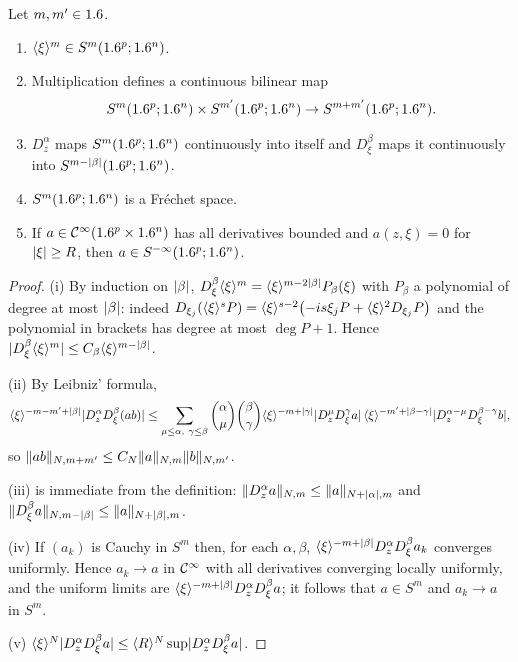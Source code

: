 \begin{lemma}\label{euclidean:lem:symbol-basic}
  Let $m,m'\in1.6$.
  \begin{enumerate}[label=\textup{(\roman*)}]
  \item $\langle \xi\rangle^m\in S^m(1.6^p;1.6^n)$.
  \item Multiplication defines a continuous bilinear map
    \begin{equation*}
      S^m(1.6^p;1.6^n)\times S^{m'}(1.6^p;1.6^n)\to S^{m+m'}(1.6^p;1.6^n).
    \end{equation*}
  \item $D^\alpha_z$ maps $S^m(1.6^p;1.6^n)$ continuously into itself and
    $D^\beta_\xi$ maps it continuously into $S^{m-\lvert \beta\rvert}(1.6^p;1.6^n)$.
  \item $S^m(1.6^p;1.6^n)$ is a Fr\'echet space.
  \item If $a\in\mathcal{C}^\infty(1.6^p\times1.6^n)$ has all derivatives bounded and
    $a(z,\xi)=0$ for $\lvert \xi\rvert\ge R$, then $a\in S^{-\infty}(1.6^p;1.6^n)$.
  \end{enumerate}
\end{lemma}
\begin{proof}
  (i) By induction on $\lvert \beta\rvert$,
  $D^\beta_\xi\langle \xi\rangle^m=\langle \xi\rangle^{m-2\lvert \beta\rvert}P_\beta(\xi)$ with $P_\beta$ a
  polynomial of degree at most $\lvert \beta\rvert$: indeed
  $D_{\xi_j}(\langle \xi\rangle^{s}P)=\langle \xi\rangle^{s-2}\bigl(-is\xi_jP+\langle \xi\rangle^2D_{\xi_j}P\bigr)$
  and the polynomial in brackets has degree at most $\deg P+1$. Hence
  $\lvert D^\beta_\xi\langle \xi\rangle^m\rvert\le C_\beta\langle \xi\rangle^{m-\lvert \beta\rvert}$.

  (ii) By Leibniz' formula,
  \begin{equation*}
    \ang\xi^{-m-m'+\abs\beta}\abs{D^\alpha_zD^\beta_\xi(ab)}
    \le\sum_{\mu\le\alpha,\ \gamma\le\beta}\binom\alpha\mu\binom\beta\gamma
    \ang\xi^{-m+\abs\gamma}\abs{D^\mu_zD^\gamma_\xi a}\,
    \ang\xi^{-m'+\abs{\beta-\gamma}}\abs{D^{\alpha-\mu}_zD^{\beta-\gamma}_\xi b},
  \end{equation*}
  so $\lVert ab\rVert_{N,m+m'}\le C_N\lVert a\rVert_{N,m}\lVert b\rVert_{N,m'}$.

  (iii) is immediate from the definition:
  $\lVert D^\alpha_za\rVert_{N,m}\le\lVert a\rVert_{N+\lvert \alpha\rvert,m}$ and
  $\lVert D^\beta_\xi a\rVert_{N,m-\lvert \beta\rvert}\le\lVert a\rVert_{N+\lvert \beta\rvert,m}$.

  (iv) If $(a_k)$ is Cauchy in $S^m$ then, for each $\alpha,\beta$,
  $\langle \xi\rangle^{-m+\lvert \beta\rvert}D^\alpha_zD^\beta_\xi a_k$ converges uniformly. Hence
  $a_k\to a$ in $\mathcal{C}^\infty$ with all derivatives converging locally uniformly, and
  the uniform limits are $\langle \xi\rangle^{-m+\lvert \beta\rvert}D^\alpha_zD^\beta_\xi a$; it
  follows that $a\in S^m$ and $a_k\to a$ in $S^m$.

  (v) $\langle \xi\rangle^{N}\lvert D^\alpha_zD^\beta_\xi a\rvert\le\langle R\rangle^N\sup\lvert D^\alpha_zD^\beta_\xi a\rvert$.
\end{proof}

